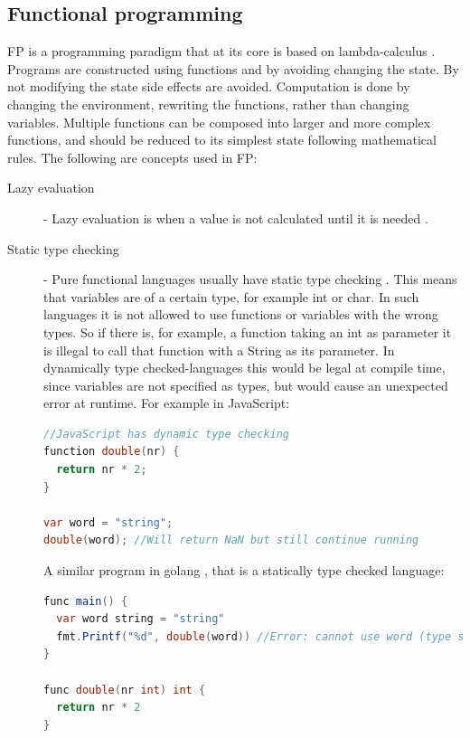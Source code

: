 \documentclass {article}
\begin{document}
\subsection{Functional programming}
FP is a programming paradigm that at its core is based on lambda-calculus \cite{gabmar}. Programs are constructed using functions and by avoiding changing the state. By not modifying the state side effects are avoided. Computation is done by changing the environment, rewriting the functions, rather than changing variables. Multiple functions can be composed into larger and more complex functions, and should be reduced to its simplest state following mathematical rules. The following are concepts used in FP:
\begin{description}
\item [Lazy evaluation] - Lazy evaluation is when a value is not calculated until it is needed \cite{fogus}.
\item [Static type checking] - Pure functional languages usually have static type checking \cite{gabmar}. This means that variables are of a certain type, for example int or char. In such languages it is not allowed to use functions or variables with the wrong types. So if there is, for example, a function taking an int as parameter it is illegal to call that function with a String as its parameter. In dynamically type checked-languages this would be legal at compile time, since variables are not specified as types, but would cause an unexpected error at runtime. For example in JavaScript:
 
\begin{lstlisting}[language=Java]
//JavaScript has dynamic type checking
function double(nr) {
  return nr * 2;
}
 
var word = "string";
double(word); //Will return NaN but still continue running
\end{lstlisting}
 
\item [ ] A similar program in golang \cite{golang}, that is a statically type checked language:
 
\begin{lstlisting}[language=Java]
func main() {
  var word string = "string"
  fmt.Printf("%d", double(word)) //Error: cannot use word (type string) as type int in argument to double
}
 
func double(nr int) int {
  return nr * 2
}
\end{lstlisting}
 

\end{description}
\end{document}
